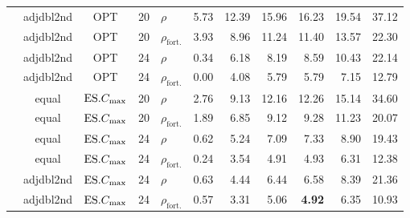 \begin{table}[ht]
{\begin{tabular}{lcc@{ }c@{ }lrrrrrr}
& adjdbl2nd & OPT & 20 & $\rho$ & 5.73 & 12.39 & 15.96 & 16.23 & 19.54 & 37.12 
\\ 
& adjdbl2nd & OPT & 20 & $\rho_{\text{fort.}}$ & 3.93 & 8.96 & 11.24 & 11.40 & 
13.57 & 22.30 \\ 
& adjdbl2nd & OPT & 24 & $\rho$ & 0.34 & 6.18 & 8.19 & 8.59 & 10.43 & 22.14 \\ 
& adjdbl2nd & OPT & 24 & $\rho_{\text{fort.}}$ & 0.00 & 4.08 & 5.79 & 5.79 & 
7.15 & 12.79 \\ 
& equal & $\text{ES}.{C_{\max}}$ & 20 & $\rho$ & 2.76 & 9.13 & 12.16 & 12.26 & 15.14 & 
34.60 
\\ 
& equal & $\text{ES}.{C_{\max}}$ & 20 & $\rho_{\text{fort.}}$ & 1.89 & 6.85 & 9.12 & 9.28 & 
11.23 & 20.07 \\ 
& equal & $\text{ES}.{C_{\max}}$ & 24 & $\rho$ & 0.62 & 5.24 & 7.09 & 7.33 & 8.90 & 19.43 
\\ 
& equal & $\text{ES}.{C_{\max}}$ & 24 & $\rho_{\text{fort.}}$ & 0.24 & 3.54 & 4.91 & 4.93 & 
6.31 & 12.38 \\ 
& adjdbl2nd & $\text{ES}.{C_{\max}}$ & 24 & $\rho$ & 0.63 & 4.44 & 6.44 & 6.58 & 8.39 & 
21.36 \\ 
& adjdbl2nd & $\text{ES}.{C_{\max}}$ & 24 & $\rho_{\text{fort.}}$ & 0.57 & 3.31 & 5.06 & 
\textbf{4.92} & 
6.35 & 10.93 \\ 
\bottomrule
\end{tabular}}
\end{table}